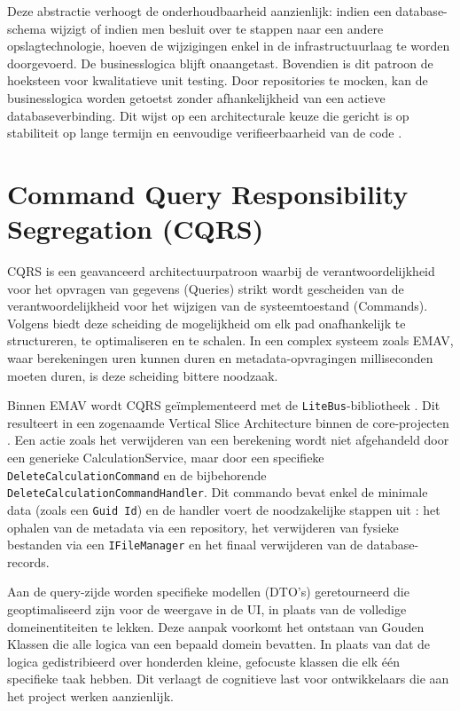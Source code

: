 Deze abstractie verhoogt de onderhoudbaarheid aanzienlijk: indien een database-schema wijzigt of indien men besluit over te stappen naar een andere opslagtechnologie, hoeven de wijzigingen enkel in de infrastructuurlaag te worden doorgevoerd. 
De businesslogica blijft onaangetast. 
Bovendien is dit patroon de hoeksteen voor kwalitatieve unit testing. 
Door repositories te mocken, kan de businesslogica worden getoetst zonder afhankelijkheid van een actieve databaseverbinding. 
Dit wijst op een architecturale keuze die gericht is op stabiliteit op lange termijn en eenvoudige verifieerbaarheid van de code \autocite{millett2015patterns}.

\section{Command Query Responsibility Segregation (CQRS)}
{\sloppy CQRS is een geavanceerd architectuurpatroon waarbij de verantwoordelijkheid voor het opvragen van gegevens (Queries) strikt wordt gescheiden van de verantwoordelijkheid voor het wijzigen van de systeemtoestand (Commands). Volgens \textcite{fowlerCQRS} biedt deze scheiding de mogelijkheid om elk pad onafhankelijk te structureren, te optimaliseren en te schalen. In een complex systeem zoals EMAV, waar berekeningen uren kunnen duren en metadata-opvragingen milliseconden moeten duren, is deze scheiding bittere noodzaak.\par}

Binnen EMAV wordt CQRS geïmplementeerd met de \texttt{LiteBus}-bibliotheek \autocite{litebus}. 
Dit resulteert in een zogenaamde Vertical Slice Architecture binnen de core-projecten \autocite{jimmyBogardVerticalSlice}. 
Een actie zoals het verwijderen van een berekening wordt niet afgehandeld door een generieke CalculationService, maar door een specifieke \texttt{DeleteCalculationCommand} en de bijbehorende \texttt{DeleteCalculationCommandHandler}. 
Dit commando bevat enkel de minimale data (zoals een \texttt{Guid Id}) en de handler voert de noodzakelijke stappen uit : het ophalen van de metadata via een repository, het verwijderen van fysieke bestanden via een \texttt{IFileManager} en het finaal verwijderen van de database-records.

Aan de query-zijde worden specifieke modellen (DTO's) geretourneerd die geoptimaliseerd zijn voor de weergave in de UI, in plaats van de volledige domeinentiteiten te lekken. 
Deze aanpak voorkomt het ontstaan van Gouden Klassen die alle logica van een bepaald domein bevatten. 
In plaats van dat de logica gedistribieerd over honderden kleine, gefocuste klassen die elk één specifieke taak hebben. 
Dit verlaagt de cognitieve last voor ontwikkelaars die aan het project werken aanzienlijk.

